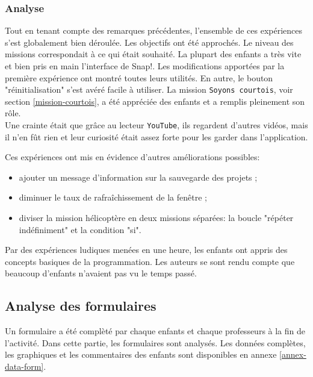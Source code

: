 \subsubsection{Analyse}
\label{analyse-scienceinfuse}
Tout en tenant compte des remarques précédentes, l'ensemble de ces expériences s'est globalement bien déroulée. Les objectifs ont été approchés. Le niveau des missions correspondait à ce qui était souhaité. La plupart des enfants a très vite et bien pris en main l'interface de Snap!. Les modifications apportées par la première expérience ont montré toutes leurs utilités. En autre, le bouton "réinitialisation" s'est avéré facile à utiliser. La mission \texttt{Soyons courtois}, voir section \ref{mission-courtois}, a été appréciée des enfants et a remplis pleinement son rôle.\\

Une crainte était que grâce au lecteur \texttt{YouTube}, ils regardent d'autres vidéos, mais il n'en fût rien et leur curiosité était assez forte pour les garder dans l'application.

Ces expériences ont mis en évidence d'autres améliorations possibles: 
\begin{itemize}
  \item ajouter un message d'information sur la sauvegarde des projets ;
  \item diminuer le taux de rafraîchissement de la fenêtre ;
  \item diviser la mission hélicoptère en deux missions séparées: la boucle "répéter indéfiniment" et la condition "si".
\end{itemize}

Par des expériences ludiques menées en une heure, les enfants ont appris des concepts basiques de la programmation. Les auteurs se sont rendu compte que beaucoup d'enfants n'avaient pas vu le temps passé.

\subsection{Analyse des formulaires}
\label{analyse-exp}
Un formulaire a été complèté par chaque enfants et chaque professeurs à la fin de l'activité. Dans cette partie, les formulaires sont analysés. Les données complètes, les graphiques et les commentaires des enfants sont disponibles en annexe \ref{annex-data-form}. %

